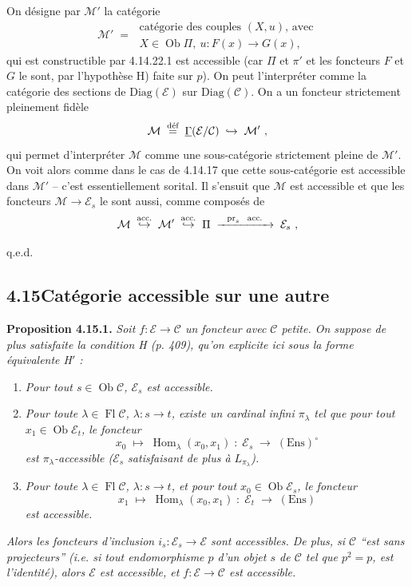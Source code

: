 \documentclass[11pt]{article}
\newcommand{\printedpage}[1]{\marginpar{\footnotesize p.~#1}}
\newcommand{\msp}[1]{\marginpar{\footnotesize [#1]}}
\newcommand{\cE}{\mathcal{E}}
\newcommand{\cC}{\mathcal{C}}
\newcommand{\cM}{\mathcal{M}}
\newcommand{\Ob}{\operatorname{Ob}}
\newcommand{\Fl}{\operatorname{Fl}}
\newcommand{\Hom}{\operatorname{Hom}}
\newcommand{\Ens}{\mathrm{Ens}}
\newcommand{\pr}{\mathrm{pr}}
\newcommand{\defeq}{\overset{\text{\upshape déf}}{=}}
\begin{document}
\printedpage{161}

\msp{page 424}
On désigne par $\cM'$ la catégorie
\[
\cM' \;=\;
\begin{array}{l}
\text{catégorie des couples } (X,u)\text{, avec}\\
X \in \Ob\Pi,\ u : F(x) \longrightarrow G(x),
\end{array}
\] %
qui est constructible par 4.14.22.1 est accessible (car $\Pi$ et $\pi'$ et les foncteurs $F$ et $G$ le sont, par l'hypothèse H) faite sur $p$). On peut l'interpréter comme la catégorie des sections %
de $\mathrm{Diag}(\cE)$ sur $\mathrm{Diag}(\cC)$. On a un foncteur strictement pleinement fidèle
\[
\cM \;\defeq\; \underline{\Gamma}(\cE/\cC) \;\hookrightarrow\; \cM'\ ,
\]
qui permet d'interpréter $\cM$ comme une sous-catégorie strictement pleine de $\cM'$. On voit alors comme dans le cas de 4.14.17 que cette sous-catégorie est accessible dans $\cM'$ -- c'est essentiellement sorital. Il s'ensuit que $\cM$ est accessible et que les foncteurs $\cM \longrightarrow \cE_s$ le sont aussi, comme composés de
\[
\cM \;\overset{\text{\upshape acc.}}{\hookrightarrow}\; \cM' \;\overset{\text{\upshape acc.}}{\hookrightarrow}\; \Pi \;\xrightarrow{\ \ \pr_s\ \ \text{\upshape acc.}\ \ }\; \cE_s\ ,
\]

\hfill q.e.d.

\msp{page 425}

\subsection*{4.15\quad Catégorie accessible sur une autre}

\textbf{Proposition 4.15.1.} \textit{Soit $f : \cE \longrightarrow \cC$ un foncteur avec $\cC$ petite. On suppose de plus satisfaite la condition H (p. 409), qu'on explicite ici sous la forme équivalente H$'$ :}
\begin{enumerate}
\item[\textit{H 1)}] \textit{Pour tout $s \in \Ob\cC$, $\cE_s$ est accessible.}
\item[\textit{H 2)}] \textit{Pour toute $\lambda \in \Fl\cC$, $\lambda : s \longrightarrow t$, existe un cardinal infini $\pi_\lambda$ tel que pour tout $x_1 \in \Ob\cE_t$, le foncteur}
\[
x_0 \;\longmapsto\; \Hom_\lambda(x_0,x_1) \;:\; \cE_s \;\longrightarrow\; (\Ens)^\circ
\]
\textit{est $\pi_\lambda$-accessible ($\cE_s$ satisfaisant de plus à $L_{\pi_\lambda}$).}
\item[\textit{H 3)}] \textit{Pour toute $\lambda \in \Fl\cC$, $\lambda : s \longrightarrow t$, et pour tout $x_0 \in \Ob\cE_s$, le foncteur}
\[
x_1 \;\longmapsto\; \Hom_\lambda(x_0,x_1) \;:\; \cE_t \;\longrightarrow\; (\Ens)
\]
\textit{est accessible.}
\end{enumerate}
\textit{Alors les foncteurs d'inclusion $i_s : \cE_s \longrightarrow \cE$ sont accessibles. De plus, si $\cC$ ``est sans projecteurs'' (i.e. si tout endomorphisme $p$ d'un objet $s$ de $\cC$ tel que $p^2 = p$, est l'identité), alors $\cE$ est accessible, et $f : \cE \longrightarrow \cC$ est accessible.}
\end{document}
